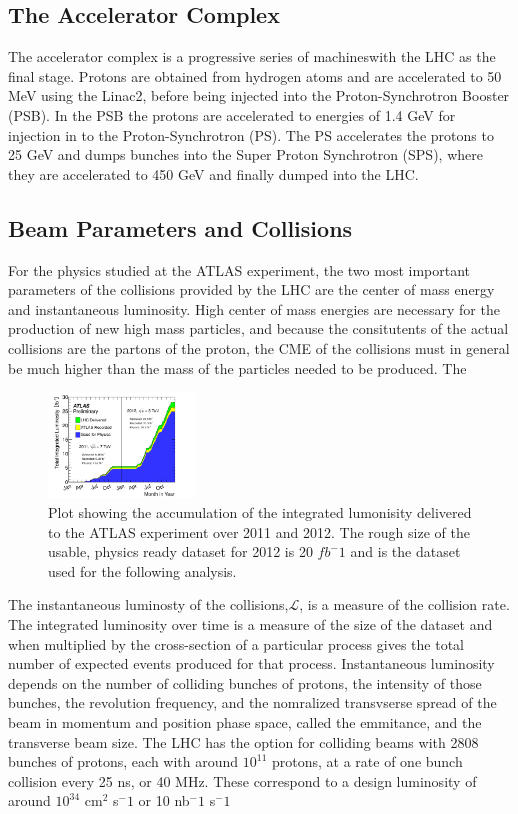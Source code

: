 \subsection{The Accelerator Complex}

The accelerator complex is a progressive series of machineswith the LHC as the final stage.
Protons are obtained from hydrogen atoms and are accelerated to 50 MeV using the
Linac2, before being injected into the Proton-Synchrotron Booster (PSB). In
the PSB the protons are accelerated to energies of 1.4 GeV for injection
in to the Proton-Synchrotron (PS). The PS accelerates the protons to 25 GeV
and dumps bunches into the Super Proton Synchrotron (SPS), where they 
are accelerated to 450 GeV and finally dumped into the LHC. 

\subsection{Beam Parameters and Collisions} 

For the physics studied at the ATLAS experiment, the two most important parameters of
the collisions provided by the LHC are the center of mass energy and instantaneous luminosity.
High center of mass energies are necessary for the production
of new high mass particles, and because the consitutents of the actual collisions
are the partons of the proton, the CME of the collisions must in general
be much higher than the mass of the particles needed to be produced. The

\begin{figure}[!t]
\centering 
\includegraphics[width=0.35\textwidth]{figs/intlumivstime2011-2012DQ.pdf}
\caption{ Plot showing the accumulation of the integrated lumonisity delivered to the ATLAS experiment over 2011 and 2012. The rough size of the usable, physics ready dataset for 2012 is 20 $fb^-1$ and is the dataset used for the following analysis. 
}
\label{figure:lhc_lumi}
\end{figure}

The instantaneous luminosty of the collisions,$\mathcal{L}$, is a measure of the
collision rate. The integrated luminosity over time is a measure of the size
of the dataset and when multiplied by the cross-section of a particular process
gives the total number of expected events produced for that process.
Instantaneous luminosity depends on the number of colliding bunches of protons,
the intensity of those bunches, the revolution
frequency, and the nomralized transvserse spread of the beam in momentum and position
phase space, called the emmitance, and the transverse beam size. The LHC has the
option for colliding beams with 2808 bunches of protons, each with around $10^11$ protons,
at a rate of one bunch collision every 25 ns, or 40 MHz. These correspond
to a design luminosity of around $10^34$ cm$^{2}$ s$^-1$ or 10 nb$^-1$ s$^-1$
  
